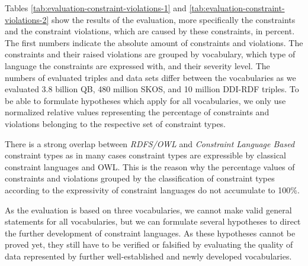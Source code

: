 \documentclass[conference]{IEEEtran}
\newcommand{\tb}[1]{\todo[size=\small, color=green!40]{\textbf{Thomas:} #1}}
\begin{document}
Tables \ref{tab:evaluation-constraint-violations-1} and \ref{tab:evaluation-constraint-violations-2} show the results of the evaluation, more specifically the constraints and the constraint violations, which are caused by these constraints, in percent. The first numbers indicate the absolute amount of constraints and violations. The constraints and their raised violations are grouped by vocabulary, which type of language the constraints are expressed with, and their severity level.
The numbers of evaluated triples and data sets differ between the vocabularies
as we evaluated 3.8 billion QB, 480 million SKOS, and 10 million DDI-RDF triples.
To be able to formulate hypotheses which apply for all vocabularies, 
we only use normalized relative values representing the percentage of constraints and violations belonging to the respective set of constraint types. 

There is a strong overlap between \emph{RDFS/OWL} and \emph{Constraint Language Based} constraint types as in many cases constraint types are expressible by classical constraint languages and OWL. This is the reason why the percentage values of constraints and violations grouped by the classification of constraint types according to the expressivity of constraint languages do not accumulate to 100\%. 

As the evaluation is based on three vocabularies, 
we cannot make valid general statements for all vocabularies,
but we can formulate several hypotheses to direct the further development of constraint languages.
As these hypotheses cannot be proved yet, 
they still have to be verified or falsified
by evaluating the quality of data represented by further well-established and newly developed vocabularies.

\end{document}
